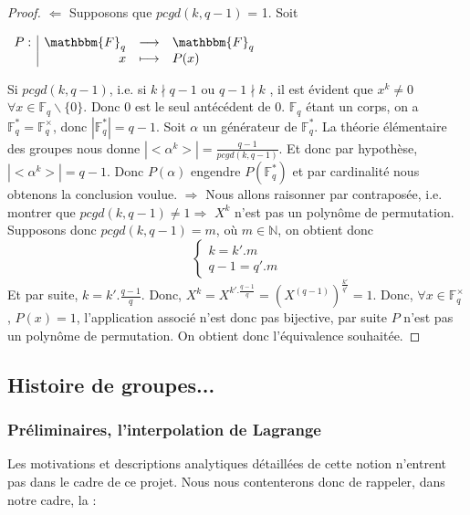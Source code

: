 \documentclass[12pt]{article}
\newcommand{\F}{\mathbbm{F}}
\newcommand{\Fq}{\mathds{F}_q}
\theoremstyle{definition}
\begin{document}
\begin{proof}

$\Leftarrow$ Supposons que $pcgd(k,q-1)$ = 1.
Soit
\begin{center}
$
\begin{array}{l|rcl}
\displaystyle
P : & \F _q & \longrightarrow & \F _q \\
    & x & \longmapsto & P(x)
\end{array}
$
\end{center}
Si $pcgd(k,q-1)$, i.e. si $k \nmid q-1$ ou $q-1 \nmid k$ , il est évident que  $x^k \neq 0$ $\forall x \in \Fq \backslash\{0\}$. Donc 0 est le seul antécédent de 0.
$\Fq$ étant un corps, on a $\Fq^* = \Fq^{\times}$, donc $|\Fq^*| = q-1$. Soit $\alpha$ un générateur de $\Fq^*$. La théorie élémentaire des groupes nous donne $|<\alpha^k>| = \frac{q-1}{pcgd(k,q-1)}$. Et donc par hypothèse, $|<\alpha^k>| =  q-1$.  Donc $P(\alpha)$ engendre $P(\Fq^*)$ et par cardinalité nous obtenons la conclusion voulue.\newline
$\Rightarrow$ Nous allons raisonner par contraposée, i.e. montrer que $pcgd(k,q-1) \ne 1 \Rightarrow$ $X^k$ n'est pas un polynôme de permutation.\newline
Supposons donc $pcgd(k,q-1) = m$, où $m \in \mathds{N}$, on obtient donc 
$$
\left\{
    \begin{array}{ll}
        k = k'.m \\
        q-1 = q'.m
    \end{array}
\right.
$$
Et par suite, $k  =k'.\frac{q-1}{q}$.\newline
Donc, $X^k = X^{k'.\frac{q-1}{q}} = (X^{(q-1)})^{\frac{k'}{q'}} = 1$. Donc, $\forall x \in \Fq^{\times}$, $P(x) = 1$, l'application associé n'est donc pas bijective, par suite $P$ n'est pas un polynôme de permutation. \newline
On obtient donc l'équivalence souhaitée.
\end{proof}

\subsection{Histoire de groupes...}
\subsubsection{Préliminaires, l'interpolation de Lagrange}

Les motivations et descriptions analytiques détaillées de cette notion n'entrent pas dans le cadre de ce projet. Nous nous contenterons donc de rappeler, dans notre cadre, la :
\end{document}
